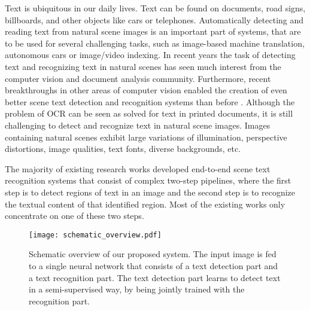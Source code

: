 \documentclass[letterpaper]{article}
\begin{document}
	Text is ubiquitous in our daily lives.
	Text can be found on documents, road signs, billboards, and other objects like cars or telephones.
	Automatically detecting and reading text from natural scene images is an important part of systems, that are to be used for several challenging tasks, such as image-based machine translation, autonomous cars or image/video indexing.
	In recent years the task of detecting text and recognizing text in natural scenes has seen much interest from the computer vision and document analysis community.
	Furthermore, recent breakthroughs \cite{He2016Deep,Jaderberg2015Spatial,Redmon2016You,Ren2015Faster} in other areas of computer vision enabled the creation of even better scene text detection and recognition systems than before \cite{Gomez2017Textproposals,Gupta2016Syntheticb,Shi2016Robust}.
	Although the problem of \ac{OCR} can be seen as solved for text in printed documents, it is still challenging to detect and recognize text in natural scene images.
	Images containing natural scenes exhibit large variations of illumination, perspective distortions, image qualities, text fonts, diverse backgrounds, etc.

	The majority of existing research works developed end-to-end scene text recognition systems that consist of complex two-step pipelines, where the first step is to detect regions of text in an image and the second step is to recognize the textual content of that identified region.
	Most of the existing works only concentrate on one of these two steps.

	\begin{figure}[t]
		\centering
		\texttt{[image: schematic\_overview.pdf]}
		\caption{Schematic overview of our proposed system. The input image is fed to a single neural network that consists of a text detection part and a text recognition part. The text detection part learns to detect text in a semi-supervised way, by being jointly trained with the recognition part.}
		\label{fig:schematic_of_system}
	\end{figure}
\end{document}
